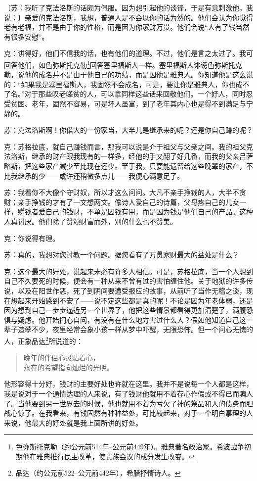 \documentclass[11pt,oneside]{book}
\begin{document}
\begin{common-format}
〔苏：我听了克法洛斯的话颇为佩服。因为想引起他的谈锋，于是有意刺激他。我说：〕亲爱的克法洛斯，我想，普通人是不会以你的话为然的。他们会认为你觉得老有老福，并不是由于你的性格，而是因为你家财万贯。他们会说“人有了钱当然有很多安慰”。

克：讲得好，他们不信我的话，也有他们的道理。不过，他们是言之太过了。我可回答他们，如色弥斯托克勒\footnote{色弥斯托克勒（约公元前514年--公元前449年）。雅典著名政治家。希波战争初期他在雅典推行民主改革，使贵族会议的成分发生改变。}回答塞里福斯人一样。塞里福斯人诽谤色弥斯托克勒，说他的成名并不是由于他自己的功绩，而是因他是雅典人。你知道他是这么说的：“如果我是塞里福斯人，我固然不会成名，可是，要让你是雅典人，你也成不了名。”对于那些叹老嗟贫的人，可以拿同样这些话来回敬他们。一个好人，同时忍受贫困、老年，固然不容易，可是坏人虽富，到了老年其内心也是得不到满足与宁静的。

苏：克法洛斯啊！你偌大的一份家当，大半儿是继承来的呢？还是你自己赚的呢？

克：苏格拉底，就自己赚钱而言，那我可以说是介于祖父与父亲之间。我的祖父克法洛斯，继承的财产跟我现有的一样多，经他的手又翻了好几番，而我的父亲吕萨略斯，把这些家产减少至比现在还少。至于我，只要能遗留给这些晚辈的家产，不比我继承的少——或许还稍微多点儿——我便心满意足了。

苏：我看你不大像个守财奴，所以才这么问问。大凡不亲手挣钱的人，大半不贪财；亲手挣钱的才有了一文想两文。像诗人爱自己的诗篇，父母疼自己的儿女一样，赚钱者爱自己的钱财，不单是因钱有用，而是因为钱是他们自己的产品。这种人真讨厌。他们除了赞颂财富而外，别的什么也不赞美。

克：你说得有理。

苏：真的，我想对您讨教一个问题。据您看有了万贯家财最大的益处是什么？

克：这个最大的好处，说起来未必有许多人相信。可是，苏格拉底，当一个人想到自己不久要死的时候，便会有一种从来不曾有过的害怕缠住他。关于地狱的许多传说，以及在阳世作恶，死了到阴间要遭受报应的故事，从前听了当作无稽之谈，现在想起来开始感到不安了——说不定这些都是真的呢！不论是因为年老体弱，还是因为想到自己一步步逼近另一个世界了，他把这些情景都看得更加清楚了，满腹恐惧与疑虑。他开始扪心自问，有没有在什么地方害过什么人？假如他知道自己这一辈子造孽不少，夜里经常会象小孩一样从梦中吓醒，无限恐怖。但一个问心无愧的人，正象品达\footnote{品达（约公元前522--公元前442年），希腊抒情诗人。}所说道的：
\begin{verse}
晚年的伴侣心灵贴着心，\\
永存的希望指向灿烂的光明。
\end{verse}

他形容得十分好，钱财的主要好处也许就在这里。我并不是说每一个人都是这样，我是说对于一个通情达理的人来说，有了钱财他就用不着存心作假或不得已而骗人了。当他要到另一世界去的时候，他也就用不着为亏欠了神的祭品和人的债务而胆战心惊了。在我看来，有钱固然有种种益处，可比较起来，对于一个明白事理的人来说，他最大的好处就是我上面所讲的好处。


\end{common-format}
\end{document}
